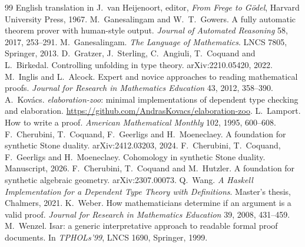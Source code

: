 \documentclass[11pt]{article}
\begin{document}
\begin{thebibliography}{99}
  English translation in J.~van Heijenoort, editor, \emph{From Frege to
  G\"odel}, Harvard University Press, 1967.
 M.~Ganesalingam and W.~T.~Gowers. A fully automatic theorem
  prover with human-style output. \emph{Journal of Automated Reasoning}
  58, 2017, 253--291.
 M.~Ganesalingam. \emph{The Language of Mathematics}. LNCS
  7805, Springer, 2013.
 D.~Gratzer, J.~Sterling, C.~Angiuli, T.~Coquand and
  L.~Birkedal. Controlling unfolding in type theory. arXiv:2210.05420,
  2022.
 M.~Inglis and L.~Alcock. Expert and novice approaches to
  reading mathematical proofs. \emph{Journal for Research in Mathematics
  Education} 43, 2012, 358--390.
 A.~Kov\'acs. \emph{elaboration-zoo}: minimal
  implementations of dependent type checking and elaboration.
  \url{https://github.com/AndrasKovacs/elaboration-zoo}.
 L.~Lamport. How to write a proof. \emph{American
  Mathematical Monthly} 102, 1995, 600--608.
 F.~Cherubini, T.~Coquand, F.~Geerligs and H.~Moeneclaey.
  A foundation for synthetic Stone duality. arXiv:2412.03203, 2024.
 F.~Cherubini, T.~Coquand, F.~Geerligs and H.~Moeneclaey.
  Cohomology in synthetic Stone duality. Manuscript, 2026.
 F.~Cherubini, T.~Coquand and M.~Hutzler. A foundation for
  synthetic algebraic geometry. arXiv:2307.00073.
 Q.~Wang. \emph{A Haskell Implementation for a Dependent
  Type Theory with Definitions}. Master's thesis, Chalmers, 2021.
 K.~Weber. How mathematicians determine if an argument is
  a valid proof. \emph{Journal for Research in Mathematics Education} 39,
  2008, 431--459.
 M.~Wenzel. Isar: a generic interpretative approach to
  readable formal proof documents. In \emph{TPHOLs'99}, LNCS 1690,
  Springer, 1999.
\end{thebibliography}
\end{document}
